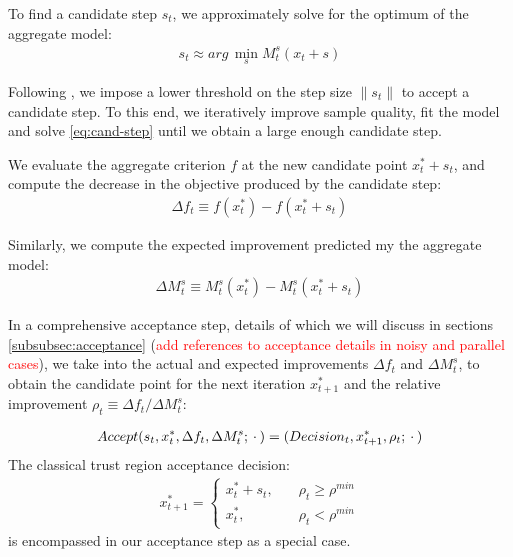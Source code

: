 To find a candidate step $s_t$, we approximately solve for the optimum of the aggregate model:
\begin{align}
    s_t\approx arg\,\min\limits_sM_t^s(x_t+s)
    \label{eq:cand-step}
\end{align}

Following \cite{PowellBobyqa}, we impose a lower threshold on the step size $\lVert s_t\rVert$ to accept a candidate step. To this end, we iteratively improve sample quality, fit the model and solve \ref{eq:cand-step} until we obtain a large enough candidate step.

We evaluate the aggregate criterion $f$ at the new candidate point $x^{*}_t+s_t$, and compute the decrease in the objective produced by the candidate step:
\begin{align}
    \Delta f_t\equiv f(x_t^*) - f(x_t^*+s_t)
    \label{eq:actual-improvement}
\end{align}

Similarly, we compute the expected improvement predicted my the aggregate model:
\begin{align}
    \Delta M^{s}_t\equiv M_t^s(x_t^*) - M_t^s(x_t^*+s_t)
    \label{eq:expected-improvement}
\end{align}

In a comprehensive acceptance step, details of which we will discuss in sections \ref{subsubsec:acceptance} (\textcolor{red}{add references to acceptance details in noisy and parallel cases}), we take into the actual and expected improvements $\Delta f_t$ and $\Delta M_t^s$, to obtain the candidate point for the next iteration $x_{t+1}^*$ and the relative improvement $\rho_t\equiv \Delta f_t/ \Delta M^s_t$:

\begin{align}
    Accept(s_t,x_t^{*},\Delta f_t,\Delta M_t^s;\hspace{0.2em}\cdot\hspace{0.2em})=(Decision_t,x_{t+1}^{*},\rho_t;\hspace{0.2em}\cdot\hspace{0.2em})
    \label{eq:acceptance-core}
\end{align}
The classical trust region acceptance decision:
\begin{align}
    x_{t+1}^*=\begin{cases}
        x_t^*+s_t,\quad&\rho_t\geq\rho^{min}\\
        x_t^*,\quad&\rho_t<\rho^{min}
    \end{cases}
    \label{eq:accept-classic}
\end{align}
is encompassed in our acceptance step as a special case.

